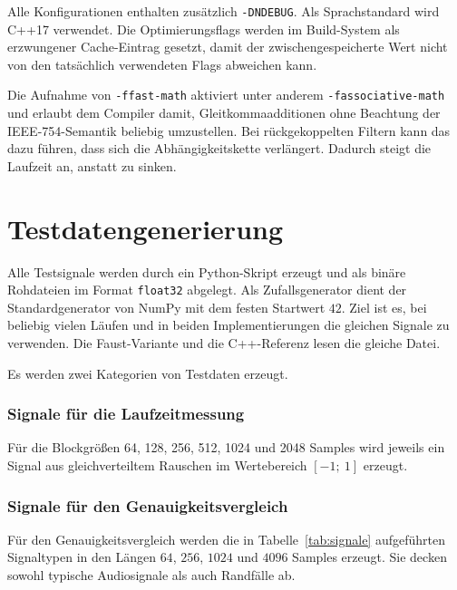 Alle Konfigurationen enthalten zusätzlich \texttt{-DNDEBUG}. Als
Sprachstandard wird C++17 verwendet. Die Optimierungsflags werden im
Build-System als erzwungener Cache-Eintrag gesetzt, damit der
zwischengespeicherte Wert nicht von den tatsächlich verwendeten Flags
abweichen kann.

Die Aufnahme von \texttt{-ffast-math} aktiviert unter anderem
\texttt{-fassociative-math} und erlaubt dem Compiler damit, Gleitkommaadditionen ohne Beachtung der IEEE-754-Semantik beliebig umzustellen. Bei rückgekoppelten Filtern kann das dazu führen, dass sich die Abhängigkeitskette verlängert. Dadurch steigt die Laufzeit an, anstatt zu sinken.

\section{Testdatengenerierung}
\label{sec:testdaten}

Alle Testsignale werden durch ein Python-Skript erzeugt und als binäre
Rohdateien im Format \texttt{float32} abgelegt. Als Zufallsgenerator dient der
Standardgenerator von NumPy mit dem festen Startwert $42$. Ziel ist es, bei beliebig vielen Läufen und in beiden Implementierungen die gleichen Signale zu verwenden. Die Faust-Variante und die C++-Referenz lesen die gleiche Datei.

Es werden zwei Kategorien von Testdaten erzeugt.

\subsubsection*{Signale für die Laufzeitmessung}

Für die Blockgrößen 64, 128, 256, 512, 1024 und 2048 Samples wird jeweils ein
Signal aus gleichverteiltem Rauschen im Wertebereich $[-1;\ 1]$ erzeugt.

\subsubsection*{Signale für den Genauigkeitsvergleich}

Für den Genauigkeitsvergleich werden die in Tabelle~\ref{tab:signale}
aufgeführten Signaltypen in den Längen $64$, $256$, $1024$ und $4096$ Samples
erzeugt. Sie decken sowohl typische Audiosignale als auch Randfälle ab.

